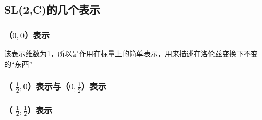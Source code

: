 \subsection{SL(2,C)的几个表示}
\subsubsection{（$0,0$）表示}
该表示维数为1，所以是作用在标量上的简单表示，用来描述在洛伦兹变换下不变的“东西”
\subsubsection{（ $\frac{1}{2},0$）表示与（$0,\frac{1}{2}$）表示}
\subsubsection{（ $\frac{1}{2},\frac{1}{2}$）表示}